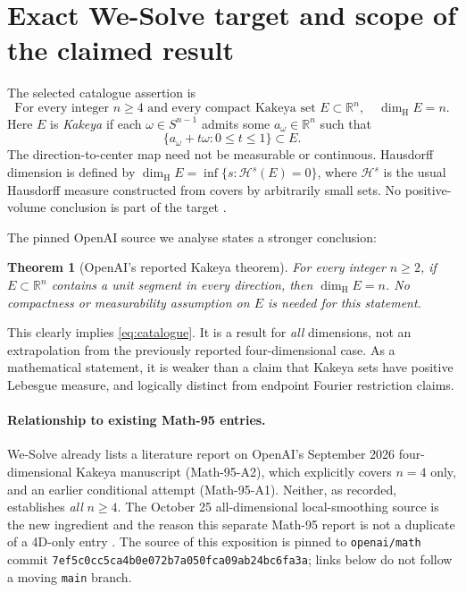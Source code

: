\documentclass[11pt,a4paper]{article}
\numberwithin{equation}{section}
\newtheorem{theorem}{Theorem}[section]
\theoremstyle{definition}
\theoremstyle{remark}
\newcommand{\R}{\mathbb R}
\newcommand{\Hs}{\mathcal H}
\newcommand{\dimH}{\dim_{\mathrm H}}
\newcommand{\Sph}{S^{n-1}}
\begin{document}
\section{Exact We-Solve target and scope of the claimed result}
\label{sec:target}
The selected catalogue assertion is
\begin{equation}\label{eq:catalogue}
  \boxed{\text{For every integer }n\ge4\text{ and every compact Kakeya set }
         E\subset\R^n,\quad \dimH E=n.}
\end{equation}
Here $E$ is \emph{Kakeya} if each $\omega\in\Sph$ admits some
$a_\omega\in\R^n$ such that
\begin{equation}\label{eq:segment}
 \{a_\omega+t\omega:0\le t\le1\}\subset E.
\end{equation}
The direction-to-center map need not be measurable or continuous.
Hausdorff dimension is defined by
$\dimH E=\inf\{s:\Hs^s(E)=0\}$, where $\Hs^s$ is the usual
Hausdorff measure constructed from covers by arbitrarily small sets.
No positive-volume conclusion is part of the target \cite{catalogue}.

The pinned OpenAI source we analyse states a stronger conclusion:
\begin{theorem}[OpenAI's reported Kakeya theorem]\label{thm:openai-kakeya}
For every integer $n\ge2$, if $E\subset\R^n$ contains a unit
segment in every direction, then $\dimH E=n$. No compactness or
measurability assumption on $E$ is needed for this statement.
\end{theorem}
This clearly implies \eqref{eq:catalogue}. It is a result for
\emph{all} dimensions, not an extrapolation from the previously
reported four-dimensional case. As a mathematical statement, it is
weaker than a claim that Kakeya sets have positive Lebesgue measure,
and logically distinct from endpoint Fourier restriction claims.

\paragraph{Relationship to existing Math-95 entries.}
We-Solve already lists a literature report on OpenAI's September 2026
four-dimensional Kakeya manuscript (Math-95-A2), which explicitly
covers $n=4$ only, and an earlier conditional attempt (Math-95-A1).
Neither, as recorded, establishes \emph{all} $n\ge4$. The October 25
all-dimensional local-smoothing source is the new ingredient and the
reason this separate Math-95 report is not a duplicate of a 4D-only
entry \cite{catalogue}. The source of this exposition is pinned to
\texttt{openai/math} commit \texttt{7ef5c0cc5ca4b0e072b7a050fca09ab24bc6fa3a}; links below do not follow
a moving \texttt{main} branch.
\end{document}
